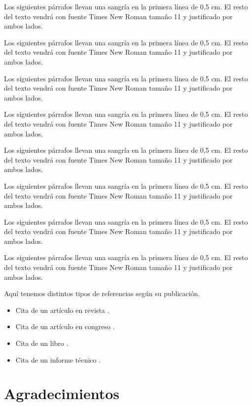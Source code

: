 \documentclass[a4paper,11pt,twocolumn,twoside]{article}
\begin{document}
Los siguientes párrafos llevan una sangría en la primera línea de
0,5 cm. El resto del texto vendrá con fuente Times New Roman
tamaño 11 y justificado por ambos lados.

Los siguientes párrafos llevan una sangría en la primera línea de
0,5 cm. El resto del texto vendrá con fuente Times New Roman
tamaño 11 y justificado por ambos lados.

Los siguientes párrafos llevan una sangría en la primera línea de
0,5 cm. El resto del texto vendrá con fuente Times New Roman
tamaño 11 y justificado por ambos lados.

Los siguientes párrafos llevan una sangría en la primera línea de
0,5 cm. El resto del texto vendrá con fuente Times New Roman
tamaño 11 y justificado por ambos lados.

Los siguientes párrafos llevan una sangría en la primera línea de
0,5 cm. El resto del texto vendrá con fuente Times New Roman
tamaño 11 y justificado por ambos lados.

Los siguientes párrafos llevan una sangría en la primera línea de
0,5 cm. El resto del texto vendrá con fuente Times New Roman
tamaño 11 y justificado por ambos lados.

Los siguientes párrafos llevan una sangría en la primera línea de
0,5 cm. El resto del texto vendrá con fuente Times New Roman
tamaño 11 y justificado por ambos lados.

Los siguientes párrafos llevan una sangría en la primera línea de
0,5 cm. El resto del texto vendrá con fuente Times New Roman
tamaño 11 y justificado por ambos lados.

Aquí tenemos distintos tipos de referencias según su publicación.

\begin{itemize}
\item Cita de un artículo en revista
\cite{Carletta96}.

\item Cita de un artículo en congreso
\cite{Connolly94}.

\item Cita de un libro \cite{Casares94}.

\item Cita de un informe técnico \cite{Ersan94}.
\end{itemize}

\section*{Agradecimientos}
\end{document}

